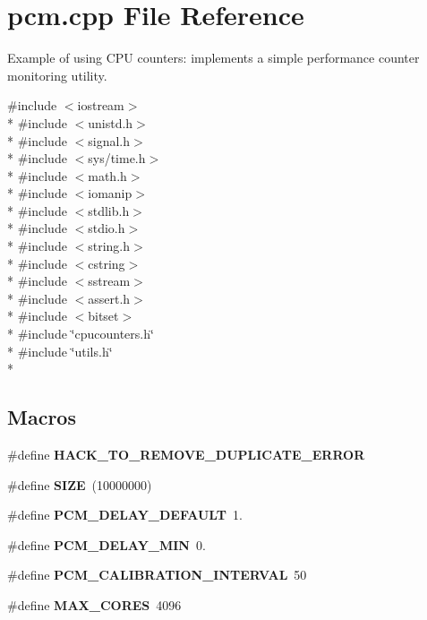 \section{pcm.\+cpp File Reference}
\label{pcm_8cpp}


Example of using C\+PU counters\+: implements a simple performance counter monitoring utility.  


{\ttfamily \#include $<$iostream$>$}\\*
{\ttfamily \#include $<$unistd.\+h$>$}\\*
{\ttfamily \#include $<$signal.\+h$>$}\\*
{\ttfamily \#include $<$sys/time.\+h$>$}\\*
{\ttfamily \#include $<$math.\+h$>$}\\*
{\ttfamily \#include $<$iomanip$>$}\\*
{\ttfamily \#include $<$stdlib.\+h$>$}\\*
{\ttfamily \#include $<$stdio.\+h$>$}\\*
{\ttfamily \#include $<$string.\+h$>$}\\*
{\ttfamily \#include $<$cstring$>$}\\*
{\ttfamily \#include $<$sstream$>$}\\*
{\ttfamily \#include $<$assert.\+h$>$}\\*
{\ttfamily \#include $<$bitset$>$}\\*
{\ttfamily \#include \char`\"{}cpucounters.\+h\char`\"{}}\\*
{\ttfamily \#include \char`\"{}utils.\+h\char`\"{}}\\*
\subsection*{Macros}
\begin{DoxyCompactItemize}
\item 
\#define {\bfseries H\+A\+C\+K\+\_\+\+T\+O\+\_\+\+R\+E\+M\+O\+V\+E\+\_\+\+D\+U\+P\+L\+I\+C\+A\+T\+E\+\_\+\+E\+R\+R\+OR}\label{pcm_8cpp_ac4eeb11d89b0f517835a12a04443ebe4}

\item 
\#define {\bfseries S\+I\+ZE}~(10000000)\label{pcm_8cpp_a70ed59adcb4159ac551058053e649640}

\item 
\#define {\bfseries P\+C\+M\+\_\+\+D\+E\+L\+A\+Y\+\_\+\+D\+E\+F\+A\+U\+LT}~1.\label{pcm_8cpp_aa9ecc55c90c7a69729babc4f5f91ed96}

\item 
\#define {\bfseries P\+C\+M\+\_\+\+D\+E\+L\+A\+Y\+\_\+\+M\+IN}~0.\label{pcm_8cpp_acccbe8441d6dd75bdc949f5f0ee126c5}

\item 
\#define {\bfseries P\+C\+M\+\_\+\+C\+A\+L\+I\+B\+R\+A\+T\+I\+O\+N\+\_\+\+I\+N\+T\+E\+R\+V\+AL}~50\label{pcm_8cpp_a433dde946b6713059756318598c9a6fe}

\item 
\#define {\bfseries M\+A\+X\+\_\+\+C\+O\+R\+ES}~4096\label{pcm_8cpp_a009855593b59738d24dbfc236edb3b14}

\end{DoxyCompactItemize}
